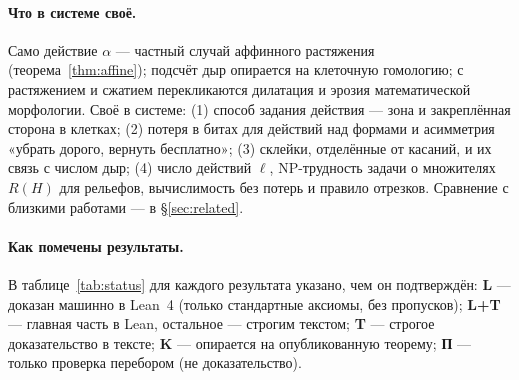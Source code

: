 \documentclass[11pt,a4paper]{article}
\theoremstyle{plain}
\theoremstyle{definition}
\theoremstyle{remark}
\begin{document}
\paragraph{Что в системе своё.} Само действие $\alpha$ — частный случай аффинного растяжения (теорема~\ref{thm:affine}); подсчёт дыр опирается на клеточную гомологию; с растяжением и сжатием перекликаются дилатация и эрозия математической морфологии. Своё в системе: (1) способ задания действия — зона и закреплённая сторона в клетках; (2) потеря в битах для действий над формами и асимметрия «убрать дорого, вернуть бесплатно»; (3) склейки, отделённые от касаний, и их связь с числом дыр; (4) число действий $\ell$, NP-трудность задачи о множителях $R(H)$ для рельефов, вычислимость без потерь и правило отрезков. Сравнение с близкими работами — в §\ref{sec:related}.

\paragraph{Как помечены результаты.} В таблице~\ref{tab:status} для каждого результата указано, чем он подтверждён: \textbf{L} — доказан машинно в Lean~4 (только стандартные аксиомы, без пропусков); \textbf{L+T} — главная часть в Lean, остальное — строгим текстом; \textbf{T} — строгое доказательство в тексте; \textbf{K} — опирается на опубликованную теорему; \textbf{П} — только проверка перебором (не доказательство).
\end{document}
